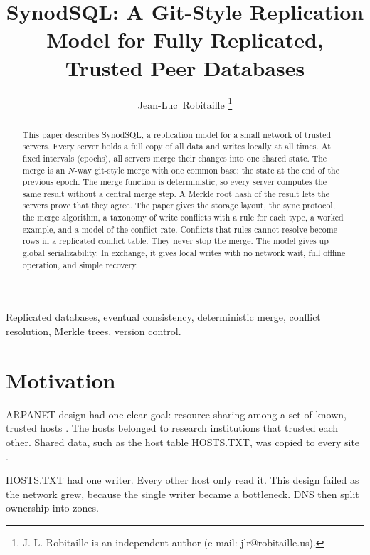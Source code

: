 \documentclass[journal]{IEEEtran}
\newcommand{\SynodSQL}{SynodSQL}
\begin{document}
\title{\SynodSQL: A Git-Style Replication Model for Fully Replicated, Trusted Peer Databases}
\author{Jean-Luc~Robitaille%
\thanks{J.-L. Robitaille is an independent author (e-mail: jlr@robitaille.us).}}
\markboth{Draft, October 2026}{Robitaille: \SynodSQL}
\maketitle

\begin{abstract}
This paper describes \SynodSQL, a replication model for a small network of trusted servers. Every server holds a full copy of all data and writes locally at all times. At fixed intervals (epochs), all servers merge their changes into one shared state. The merge is an $N$-way git-style merge with one common base: the state at the end of the previous epoch. The merge function is deterministic, so every server computes the same result without a central merge step. A Merkle root hash of the result lets the servers prove that they agree. The paper gives the storage layout, the sync protocol, the merge algorithm, a taxonomy of write conflicts with a rule for each type, a worked example, and a model of the conflict rate. Conflicts that rules cannot resolve become rows in a replicated conflict table. They never stop the merge. The model gives up global serializability. In exchange, it gives local writes with no network wait, full offline operation, and simple recovery.
\end{abstract}

\begin{IEEEkeywords}
Replicated databases, eventual consistency, deterministic merge, conflict resolution, Merkle trees, version control.
\end{IEEEkeywords}

\section{Motivation}
 ARPANET design had one clear goal: resource sharing among a set of known, trusted hosts \cite{roberts1970}. The hosts belonged to research institutions that trusted each other. Shared data, such as the host table HOSTS.TXT, was copied to every site \cite{harrenstien1985}.

HOSTS.TXT had one writer. Every other host only read it. This design failed as the network grew, because the single writer became a bottleneck. DNS then split ownership into zones.
\end{document}
